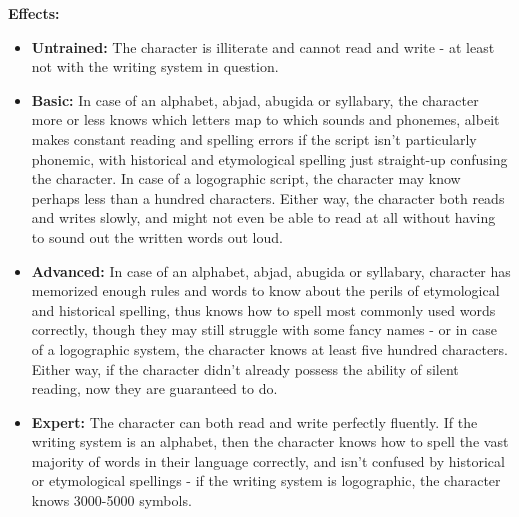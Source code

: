 \textbf{Effects:}
\begin{itemize}
	\item \textbf{Untrained:} The character is illiterate and cannot read and write - at least not with the writing system in question.
	\item \textbf{Basic:} In case of an alphabet, abjad, abugida or syllabary, the character more or less knows which letters map to which sounds and phonemes, albeit makes constant reading and spelling errors if the script isn't particularly phonemic, with historical and etymological spelling just straight-up confusing the character. In case of a logographic script, the character may know perhaps less than a hundred characters. Either way, the character both reads and writes slowly, and might not even be able to read at all without having to sound out the written words out loud.
	\item \textbf{Advanced:} In case of an alphabet, abjad, abugida or syllabary, character has memorized enough rules and words to know about the perils of etymological and historical spelling, thus knows how to spell most commonly used words correctly, though they may still struggle with some fancy names - or in case of a logographic system, the character knows at least five hundred characters. Either way, if the character didn't already possess the ability of silent reading, now they are guaranteed to do.
	\item \textbf{Expert:} The character can both read and write perfectly fluently. If the writing system is an alphabet, then the character knows how to spell the vast majority of words in their language correctly, and isn't confused by historical or etymological spellings - if the writing system is logographic, the character knows 3000-5000 symbols.
\end{itemize}\newpage
